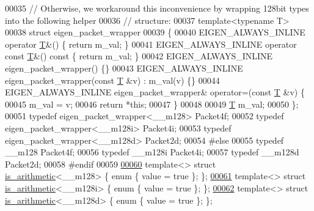 \begin{DoxyCode}
00035 \textcolor{comment}{// Otherwise, we workaround this inconvenience by wrapping 128bit types into the following helper}
00036 \textcolor{comment}{// structure:}
00037 \textcolor{keyword}{template}<\textcolor{keyword}{typename} T>
00038 \textcolor{keyword}{struct }eigen\_packet\_wrapper
00039 \{
00040   EIGEN\_ALWAYS\_INLINE \textcolor{keyword}{operator} \hyperlink{group___sparse_core___module_class_eigen_1_1_triplet}{T}&() \{ \textcolor{keywordflow}{return} m\_val; \}
00041   EIGEN\_ALWAYS\_INLINE \textcolor{keyword}{operator} \textcolor{keyword}{const} \hyperlink{group___sparse_core___module_class_eigen_1_1_triplet}{T}&() \textcolor{keyword}{const} \{ \textcolor{keywordflow}{return} m\_val; \}
00042   EIGEN\_ALWAYS\_INLINE eigen\_packet\_wrapper() \{\}
00043   EIGEN\_ALWAYS\_INLINE eigen\_packet\_wrapper(\textcolor{keyword}{const} \hyperlink{group___sparse_core___module_class_eigen_1_1_triplet}{T} &v) : m\_val(v) \{\}
00044   EIGEN\_ALWAYS\_INLINE eigen\_packet\_wrapper& operator=(\textcolor{keyword}{const} \hyperlink{group___sparse_core___module_class_eigen_1_1_triplet}{T} &v) \{
00045     m\_val = v;
00046     \textcolor{keywordflow}{return} *\textcolor{keyword}{this};
00047   \}
00048   
00049   \hyperlink{group___sparse_core___module_class_eigen_1_1_triplet}{T} m\_val;
00050 \};
00051 \textcolor{keyword}{typedef} eigen\_packet\_wrapper<\_\_m128>  Packet4f;
00052 \textcolor{keyword}{typedef} eigen\_packet\_wrapper<\_\_m128i> Packet4i;
00053 \textcolor{keyword}{typedef} eigen\_packet\_wrapper<\_\_m128d> Packet2d;
00054 \textcolor{preprocessor}{#else}
00055 \textcolor{keyword}{typedef} \_\_m128  Packet4f;
00056 \textcolor{keyword}{typedef} \_\_m128i Packet4i;
00057 \textcolor{keyword}{typedef} \_\_m128d Packet2d;
00058 \textcolor{preprocessor}{#endif}
00059 
\hyperlink{struct_eigen_1_1internal_1_1is__arithmetic_3_01____m128_01_4}{00060} \textcolor{keyword}{template}<> \textcolor{keyword}{struct }\hyperlink{struct_eigen_1_1internal_1_1is__arithmetic}{is\_arithmetic}<\_\_m128>  \{ \textcolor{keyword}{enum} \{ value = \textcolor{keyword}{true} \}; \};
\hyperlink{struct_eigen_1_1internal_1_1is__arithmetic_3_01____m128i_01_4}{00061} \textcolor{keyword}{template}<> \textcolor{keyword}{struct }\hyperlink{struct_eigen_1_1internal_1_1is__arithmetic}{is\_arithmetic}<\_\_m128i> \{ \textcolor{keyword}{enum} \{ value = \textcolor{keyword}{true} \}; \};
\hyperlink{struct_eigen_1_1internal_1_1is__arithmetic_3_01____m128d_01_4}{00062} \textcolor{keyword}{template}<> \textcolor{keyword}{struct }\hyperlink{struct_eigen_1_1internal_1_1is__arithmetic}{is\_arithmetic}<\_\_m128d> \{ \textcolor{keyword}{enum} \{ value = \textcolor{keyword}{true} \}; \};

\end{DoxyCode}
